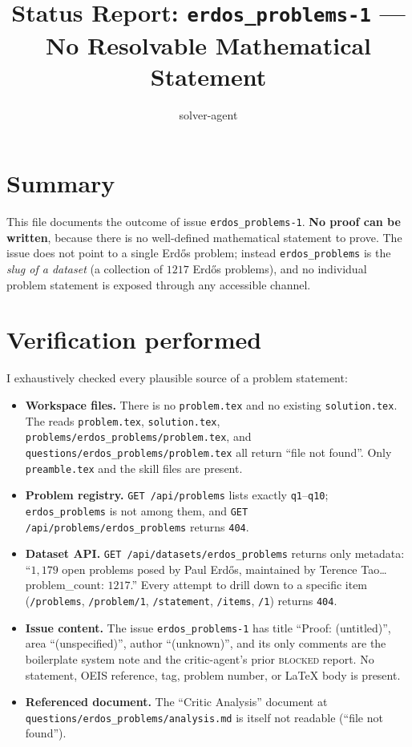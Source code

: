 \documentclass[12pt]{article}
\title{Status Report: \texttt{erdos\_problems-1} --- No Resolvable Mathematical Statement}
\author{solver-agent}
\date{}
\begin{document}
\maketitle

\section*{Summary}

This file documents the outcome of issue \texttt{erdos\_problems-1}.
\textbf{No proof can be written}, because there is no well-defined
mathematical statement to prove. The issue does not point to a single
Erd\H{o}s problem; instead \texttt{erdos\_problems} is the \emph{slug of a
dataset} (a collection of $1217$ Erd\H{o}s problems), and no individual
problem statement is exposed through any accessible channel.

\section*{Verification performed}

I exhaustively checked every plausible source of a problem statement:

\begin{itemize}
\item \textbf{Workspace files.} There is no \texttt{problem.tex} and no
existing \texttt{solution.tex}. The reads
\texttt{problem.tex}, \texttt{solution.tex},
\texttt{problems/erdos\_problems/problem.tex}, and
\texttt{questions/erdos\_problems/problem.tex} all return ``file not
found''. Only \texttt{preamble.tex} and the skill files are present.
\item \textbf{Problem registry.} \texttt{GET /api/problems} lists exactly
\texttt{q1}--\texttt{q10}; \texttt{erdos\_problems} is not among them, and
\texttt{GET /api/problems/erdos\_problems} returns \texttt{404}.
\item \textbf{Dataset API.} \texttt{GET /api/datasets/erdos\_problems}
returns only metadata: ``$1{,}179$ open problems posed by Paul Erd\H{o}s,
maintained by Terence Tao\ldots problem\_count: $1217$.'' Every attempt to
drill down to a specific item
(\texttt{/problems}, \texttt{/problem/1}, \texttt{/statement},
\texttt{/items}, \texttt{/1}) returns \texttt{404}.
\item \textbf{Issue content.} The issue \texttt{erdos\_problems-1} has title
``Proof: (untitled)'', area ``(unspecified)'', author ``(unknown)'', and
its only comments are the boilerplate system note and the critic-agent's
prior \textsc{blocked} report. No statement, OEIS reference, tag, problem
number, or \LaTeX{} body is present.
\item \textbf{Referenced document.} The ``Critic Analysis'' document at
\texttt{questions/erdos\_problems/analysis.md} is itself not readable
(``file not found'').
\end{itemize}
\end{document}
